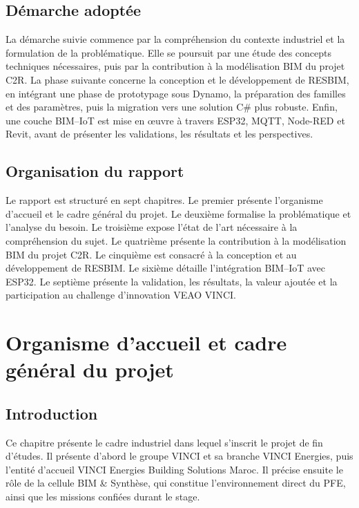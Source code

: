 \documentclass[12pt,a4paper]{report}
\begin{document}
\section*{Démarche adoptée}
La démarche suivie commence par la compréhension du contexte industriel et la formulation de la problématique. Elle se poursuit par une étude des concepts techniques nécessaires, puis par la contribution à la modélisation BIM du projet C2R. La phase suivante concerne la conception et le développement de RESBIM, en intégrant une phase de prototypage sous Dynamo, la préparation des familles et des paramètres, puis la migration vers une solution C\# plus robuste. Enfin, une couche BIM--IoT est mise en œuvre à travers ESP32, MQTT, Node-RED et Revit, avant de présenter les validations, les résultats et les perspectives.

\section*{Organisation du rapport}
Le rapport est structuré en sept chapitres. Le premier présente l'organisme d'accueil et le cadre général du projet. Le deuxième formalise la problématique et l'analyse du besoin. Le troisième expose l'état de l'art nécessaire à la compréhension du sujet. Le quatrième présente la contribution à la modélisation BIM du projet C2R. Le cinquième est consacré à la conception et au développement de RESBIM. Le sixième détaille l'intégration BIM--IoT avec ESP32. Le septième présente la validation, les résultats, la valeur ajoutée et la participation au challenge d'innovation VEAO VINCI.

\chapter{Organisme d'accueil et cadre général du projet}

\section{Introduction}

Ce chapitre présente le cadre industriel dans lequel s'inscrit le projet de fin d'études. Il présente d'abord le groupe VINCI et sa branche VINCI Energies, puis l'entité d'accueil VINCI Energies Building Solutions Maroc. Il précise ensuite le rôle de la cellule BIM \& Synthèse, qui constitue l'environnement direct du PFE, ainsi que les missions confiées durant le stage.
\end{document}
